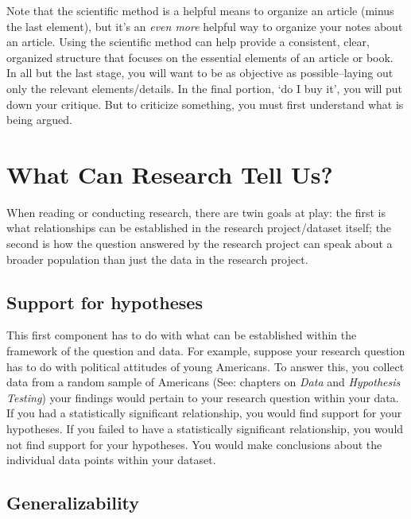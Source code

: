 \documentclass{book}
\begin{document}
Note that the scientific method is a helpful means to organize an article
(minus the last element), but it's an \emph{even more} helpful way to organize
your notes about an article. Using the scientific method can help provide a
consistent, clear, organized structure that focuses on the essential elements
of an article or book. In all but the last stage, you will want to be as
objective as possible--laying out only the relevant elements/details. In the
final portion, `do I buy it', you will put down your critique. But to
criticize something, you must first understand what is being argued.

\hypertarget{what-can-research-tell-us}{%
\section{What Can Research Tell Us?}\label{what-can-research-tell-us}}

When reading or conducting research, there are twin goals at play: the first
is what relationships can be established in the research project/dataset
itself; the second is how the question answered by the research project can
speak about a broader population than just the data in the research project.

\hypertarget{support-for-hypotheses}{%
\subsection{Support for hypotheses}\label{support-for-hypotheses}}

This first component has to do with what can be established within the
framework of the question and data. For example, suppose your research
question has to do with political attitudes of young Americans. To answer
this, you collect data from a random sample of Americans (See: chapters on
\emph{Data} and \emph{Hypothesis Testing}) your findings would pertain to your
research question within your data. If you had a statistically significant
relationship, you would find support for your hypotheses. If you failed to
have a statistically significant relationship, you would not find support for
your hypotheses. You would make conclusions about the individual data points
within your dataset.

\hypertarget{generalizability}{%
\subsection{Generalizability}\label{generalizability}}
\end{document}
